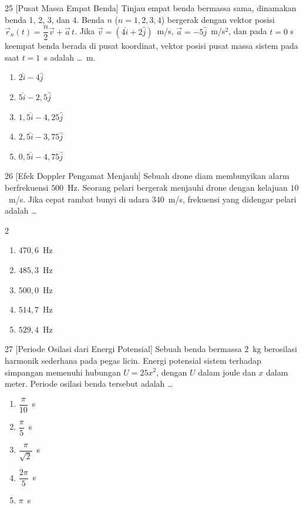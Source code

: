 \documentclass[11pt]{article}
\newenvironment{pil}{%
  \begin{enumerate}[label=(\alph*),leftmargin=*,itemsep=1pt,topsep=3pt]}%
  {\end{enumerate}}
\newenvironment{pilB}{%
  \par\smallskip\begin{multicols}{2}
  \begin{enumerate}[label=(\alph*),leftmargin=*,itemsep=1pt,topsep=3pt]}%
  {\end{enumerate}\end{multicols}}
\begin{document}
\begin{soal}{25 \normalfont\small[Pusat Massa Empat Benda]}
Tinjau empat benda bermassa sama, dinamakan benda 1, 2, 3, dan 4. Benda $n$ ($n=1,2,3,4$)
bergerak dengan vektor posisi $\vec{r}_n(t)=\dfrac{n}{2}\vec{v}+\vec{a}\,t$. Jika
$\vec{v}=(4\hat{i}+2\hat{j})$~m/s, $\vec{a}=-5\hat{j}$~m/s$^2$, dan pada $t=0$ s keempat
benda berada di pusat koordinat, vektor posisi pusat massa sistem pada saat $t=1$~s
adalah \ldots~m.
\begin{pil}
  \item $2\hat{i}-4\hat{j}$
  \item $5\hat{i}-2{,}5\hat{j}$
  \item $1{,}5\hat{i}-4{,}25\hat{j}$
  \item $2{,}5\hat{i}-3{,}75\hat{j}$
  \item $0{,}5\hat{i}-4{,}75\hat{j}$
\end{pil}
\end{soal}

\begin{soal}{26 \normalfont\small[Efek Doppler Pengamat Menjauh]}
Sebuah drone diam membunyikan alarm berfrekuensi $500$~Hz. Seorang pelari bergerak
menjauhi drone dengan kelajuan $10$~m/s. Jika cepat rambat bunyi di udara $340$~m/s,
frekuensi yang didengar pelari adalah \ldots
\begin{pilB}
  \item $470{,}6$~Hz \item $485{,}3$~Hz \item $500{,}0$~Hz \item $514{,}7$~Hz \item $529{,}4$~Hz
\end{pilB}
\end{soal}

\begin{soal}{27 \normalfont\small[Periode Osilasi dari Energi Potensial]}
Sebuah benda bermassa $2$~kg berosilasi harmonik sederhana pada pegas licin. Energi
potensial sistem terhadap simpangan memenuhi hubungan $U=25x^2$, dengan $U$ dalam joule
dan $x$ dalam meter. Periode osilasi benda tersebut adalah \ldots
\begin{pil}
  \item $\dfrac{\pi}{10}$~s \item $\dfrac{\pi}{5}$~s \item $\dfrac{\pi}{\sqrt{2}}$~s
  \item $\dfrac{2\pi}{5}$~s \item $\pi$~s
\end{pil}
\end{soal}
\end{document}
